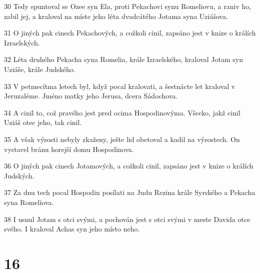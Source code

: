 \par 30 Tedy spuntoval se Ozee syn Ela, proti Pekachovi synu Romeliovu, a raniv ho, zabil jej, a kraloval na míste jeho léta dvadcátého Jotama syna Uziášova.
\par 31 O jiných pak cinech Pekachových, a cožkoli cinil, zapsáno jest v knize o králích Izraelských.
\par 32 Léta druhého Pekacha syna Romelia, krále Izraelského, kraloval Jotam syn Uziáše, krále Judského.
\par 33 V petmecítma letech byl, když pocal kralovati, a šestnácte let kraloval v Jeruzaléme. Jméno matky jeho Jerusa, dcera Sádochova.
\par 34 A cinil to, což pravého jest pred ocima Hospodinovýma. Všecko, jakž cinil Uziáš otec jeho, tak cinil.
\par 35 A však výsosti nebyly zkaženy, ješte lid obetoval a kadil na výsostech. On vystavel bránu horejší domu Hospodinova.
\par 36 O jiných pak cinech Jotamových, a cožkoli cinil, zapsáno jest v knize o králích Judských.
\par 37 Za dnu tech pocal Hospodin posílati na Judu Rezina krále Syrského a Pekacha syna Romeliova.
\par 38 I usnul Jotam s otci svými, a pochován jest s otci svými v meste Davida otce svého. I kraloval Achas syn jeho místo neho.

\chapter{16}

